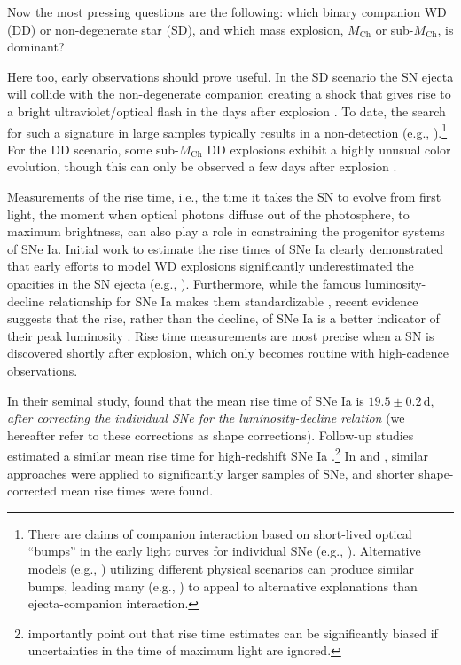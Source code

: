 \documentclass[twocolumn]{aastex63}
\begin{document}
Now the most pressing questions are the following: which binary companion WD
(DD) or non-degenerate star (SD), and which mass explosion, $M_\mathrm{Ch}$ or
sub-$M_\mathrm{Ch}$, is dominant?

Here too, early observations should prove useful. In the SD scenario the SN
ejecta will collide with the non-degenerate companion creating a shock that
gives rise to a bright ultraviolet/optical flash in the days after explosion
\citep{Kasen10a}. To date, the search for such a signature in large samples
typically results in a non-detection (e.g.,
\citealt{Hayden10,Ganeshalingam11,Bianco11}).\footnote{There are claims of
companion interaction based on short-lived optical ``bumps'' in the early
light curves for individual SNe (e.g.,
\citealt{Cao15,Marion16,Hosseinzadeh17,Dimitriadis19}). Alternative models
(e.g., \citealt{Dessart14,Piro16}) utilizing different physical scenarios can
produce similar bumps, leading many (e.g.,
\citealt{Kromer16,Shappee16a,Noebauer17,Miller18,Shappee19}) to appeal to
alternative explanations than ejecta-companion interaction.} For the DD
scenario, some sub-$M_\mathrm{Ch}$ DD explosions exhibit a highly unusual
color evolution, though this can only be observed a few days after explosion
\citep{Noebauer17,Polin19}.

Measurements of the rise time, i.e., the time it takes the SN to evolve from
first light, the moment when optical photons diffuse out of the photosphere,
to maximum brightness, can also play a role in constraining the progenitor
systems of SNe Ia. Initial work to estimate the rise times of SNe Ia clearly
demonstrated that early efforts to model WD explosions significantly
underestimated the opacities in the SN ejecta (e.g., \citealt{Riess99a}).
Furthermore, while the famous luminosity-decline relationship for SNe Ia makes
them standardizable \citep{Phillips93}, recent evidence suggests that the
rise, rather than the decline, of SNe Ia is a better indicator of their peak
luminosity \citep{Hayden19}. Rise time measurements are most precise when a SN
is discovered shortly after explosion, which only becomes routine with
high-cadence observations.

In their seminal study, \citet{Riess99a} found that the mean rise time of SNe
Ia is $19.5 \pm 0.2$\,d, \textit{after correcting the individual SNe for the
luminosity-decline relation} (we hereafter refer to these corrections as shape
corrections). Follow-up studies estimated a similar mean rise time for
high-redshift SNe Ia \citep{Aldering00,Conley06}.\footnote{\citet{Aldering00}
importantly point out that rise time estimates can be significantly biased if
uncertainties in the time of maximum light are ignored.} In \citet{Hayden10}
and \citet{Ganeshalingam11}, similar approaches were applied to significantly
larger samples of SNe, and shorter shape-corrected mean rise times were found.
\end{document}
